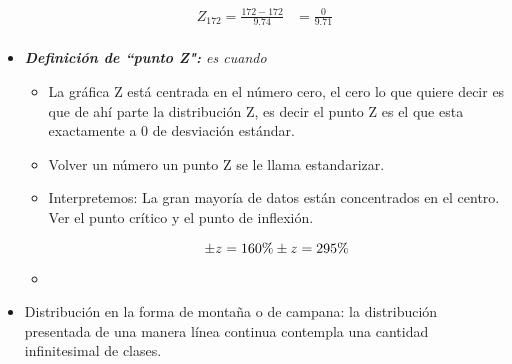 \begin{itemize}
\begin{align*}
            Z_{172} = \frac{172 - 172}{9.74} &= \frac{0}{9.71}                  \\   
        \end{align*}
    
    \item \emph{\textbf{Definición de ``punto Z":} es cuando }
        \begin{itemize}
            \item La gráfica Z está centrada en el número cero, el cero lo que quiere decir es que de ahí parte la distribución Z, es decir el punto Z es el que esta exactamente a 0 de desviación estándar.
            \item Volver un número un punto Z se le llama estandarizar. 
            \item Interpretemos: La gran mayoría de datos están concentrados en el centro. Ver el punto crítico y el punto de inflexión.
                \begin{figure}[htbp]
                    \centering
                    \caption{}
                    \label{}
                \end{figure}
                \[
                  \pm z = 1 60\% \\ 
                  \pm z = 2 95\% \\ 
                \]
            
            \item 
        \end{itemize}
    \item Distribución en la forma de montaña o de campana: la distribución presentada de una manera línea continua contempla una cantidad infinitesimal de clases.
\end{itemize}
